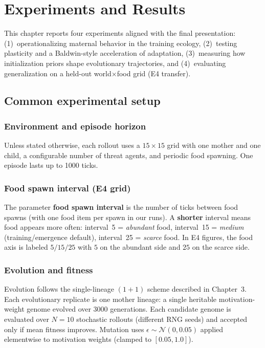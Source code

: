 \newpage
\chapter{Experiments and Results}
\label{chap:experiments}

This chapter reports four experiments aligned with the final presentation:
(1)~operationalizing maternal behavior in the training ecology,
(2)~testing plasticity and a Baldwin-style acceleration of adaptation,
(3)~measuring how initialization priors shape evolutionary trajectories, and
(4)~evaluating generalization on a held-out world$\times$food grid (E4 transfer).

\section{Common experimental setup}
\subsection{Environment and episode horizon}
Unless stated otherwise, each rollout uses a $15\times 15$ grid with one mother and one child, a configurable number of threat agents, and periodic food spawning. One episode lasts up to 1000 ticks.

\subsection{Food spawn interval (E4 grid)}
The parameter \textbf{food spawn interval} is the number of ticks between food spawns (with one food item per spawn in our runs).
A \textbf{shorter} interval means food appears more often:
interval~5 = \emph{abundant} food, interval~15 = \emph{medium} (training/emergence default), interval~25 = \emph{scarce} food.
In E4 figures, the food axis is labeled $5/15/25$ with $5$ on the abundant side and $25$ on the scarce side.

\subsection{Evolution and fitness}
Evolution follows the single-lineage $(1{+}1)$ scheme described in Chapter~3. Each evolutionary replicate is one mother lineage: a single heritable motivation-weight genome evolved over 3000 generations. Each candidate genome is evaluated over $N=10$ stochastic rollouts (different RNG seeds) and accepted only if mean fitness improves. Mutation uses $\epsilon\sim\mathcal{N}(0,0.05)$ applied elementwise to motivation weights (clamped to $[0.05,1.0]$).

